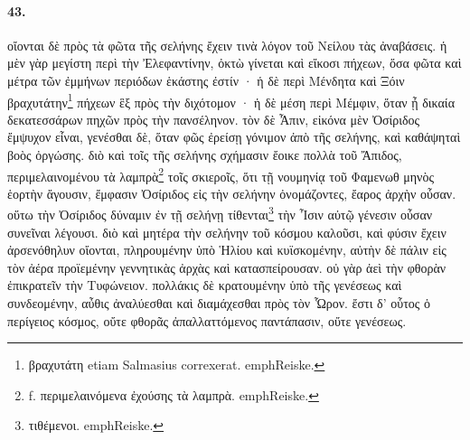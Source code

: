 \documentclass[a4paper, 11pt, oneside, polutonikogreek, german]{article}
\begin{document}
\paragraph{43.}
οἴονται δὲ πρὸς τὰ φῶτα τῆς σελήνης ἔχειν τινὰ λόγον τοῦ Νείλου τὰς ἀναβάσεις. ἡ μὲν γὰρ μεγίστη περὶ τὴν Ἐλεφαντίνην, ὀκτὼ γίνεται καὶ εἴκοσι πήχεων, ὅσα φῶτα καὶ μέτρα τῶν ἐμμήνων περιόδων ἑκάστης ἐστίν · ἡ δὲ περὶ Μένδητα καὶ Ξόιν βραχυτάτην\footnote{βραχυτάτη etiam Salmasius correxerat. emph{Reiske.}} πήχεων ἓξ πρὸς τὴν διχότομον · ἡ δὲ μέση περὶ Μέμφιν, ὅταν ᾖ δικαία δεκατεσσάρων πηχῶν πρὸς τὴν πανσέληνον. τὸν δὲ Ἆπιν, εἰκόνα μὲν Ὀσίριδος ἔμψυχον εἶναι, γενέσθαι δὲ, ὅταν φῶς ἐρείσῃ γόνιμον ἀπὸ τῆς σελήνης, καὶ καθάψηταὶ βοὸς ὀργώσης. διὸ καὶ τοῖς τῆς σελήνης σχήμασιν ἔοικε πολλὰ τοῦ Ἄπιδος, περιμελαινομένου τὰ λαμπρὰ\footnote{f. περιμελαινόμενα ἐχούσης τὰ λαμπρὰ. emph{Reiske.}} τοῖς σκιεροῖς, ὅτι τῇ νουμηνίᾳ τοῦ Φαμενωθ μηνὸς ἑορτὴν ἄγουσιν, ἔμφασιν Ὀσίριδος εἰς τὴν σελήνην ὀνομάζοντες, ἔαρος ἀρχὴν οὖσαν. οὕτω τὴν Ὀσίριδος δύναμιν ἐν τῇ σελήνῃ τίθενται\footnote{τιθέμενοι. emph{Reiske.}} τὴν Ἶσιν αὐτῷ γένεσιν οὖσαν συνεῖναι λέγουσι. διὸ καὶ μητέρα τὴν σελήνην τοῦ κόσμου καλοῦσι, καὶ φύσιν ἔχειν ἀρσενόθηλυν οἴονται, πληρουμένην ὑπὸ Ἡλίου καὶ κυϊσκομένην, αὐτὴν δὲ πάλιν εἰς τὸν ἀέρα προϊεμένην γεννητικὰς ἀρχὰς καὶ κατασπείρουσαν. οὐ γὰρ ἀεὶ τὴν φθορὰν ἐπικρατεῖν τὴν Τυφώνειον. πολλάκις δὲ κρατουμένην ὑπὸ τῆς γενέσεως καὶ συνδεομένην, αὖθις ἀναλύεσθαι καὶ διαμάχεσθαι πρὸς τὸν Ὧρον. ἔστι δ' οὗτος ὁ περίγειος κόσμος, οὔτε φθορᾶς ἀπαλλαττόμενος παντάπασιν, οὔτε γενέσεως.
\end{document}
